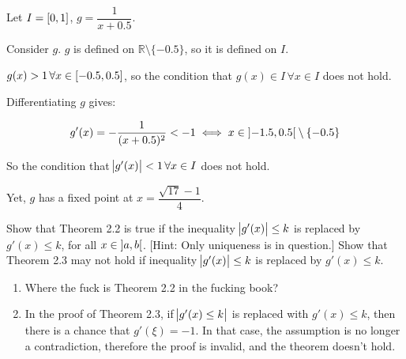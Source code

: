 \documentclass[../../../../Assignments]{subfiles}
\begin{document}
\begin{solution}
    Let \(I = \interval{0}{1}\), \(g = \dfrac{1}{x + \num{0.5}}\).

    Consider \(g\). \(g\) is defined on \(\mathbb{R} \setminus \{\num{-0.5}\}\),
    so it is defined on \(I\).

    \(g(x) > 1 \, \forall x \in \interval{\num{-0.5}}{\num{0.5}}\), so the
    condition that \(g(x) \in I \, \forall x \in I\) does not hold.

    Differentiating \(g\) gives:

    \[g'(x) = - \dfrac{1}{(x + \num{0.5})^2} < -1 \iff x \in \interval[open]{\num{-1.5}}{\num{0.5}} \setminus \{\num{-0.5}\}\]

    So the condition that \(\abs{g'(x)} < 1 \, \forall x \in I\) does not hold.

    Yet, \(g\) has a fixed point at \(x = \dfrac{\sqrt{17} - 1}{4}\).
\end{solution}

\begin{exercise}
    \begin{tasks}
        \task Show that Theorem 2.2 is true if the inequality \(\abs{g'(x)} \leq
            k\) is replaced by \(g'(x) \leq k\), for all \(x \in
            \interval[open]{a}{b}\). [Hint: Only uniqueness is in question.]
        \task Show that Theorem 2.3 may not hold if inequality \(\abs{g'(x)}
            \leq k\) is replaced by \(g'(x) \leq k\).
    \end{tasks}
\end{exercise}

\begin{solution}
    \begin{enumerate}[label = \alph*)]
        \item Where the fuck is Theorem 2.2 in the fucking book?
        \item In the proof of Theorem 2.3, if \(\abs{g'(x) \leq k}\) is replaced
            with \(g'(x) \leq k\), then there is a chance that \(g'(\xi) = -1\).
            In that case, the assumption is no longer a contradiction, therefore
            the proof is invalid, and the theorem doesn't hold.
    \end{enumerate}
\end{solution}
\end{document}
